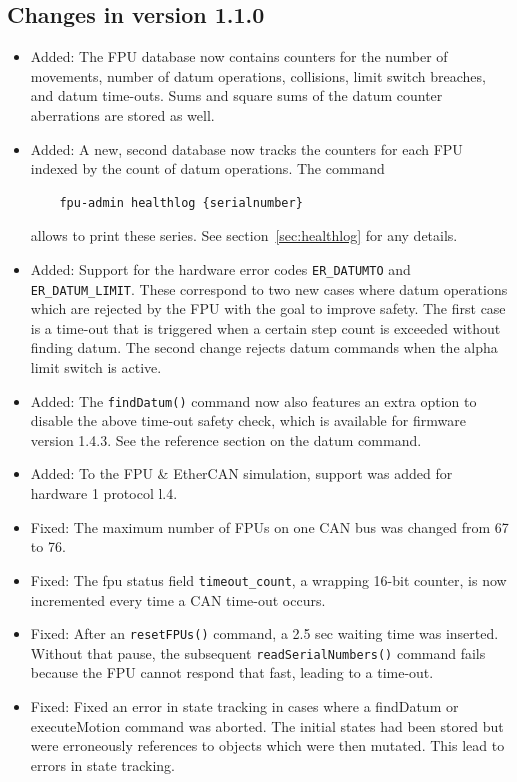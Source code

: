 \documentclass[11pt,a4paper]{scrartcl}
\begin{document}
\subsection*{Changes in version 1.1.0}
\begin{itemize}
\item Added: The FPU database now contains counters for the number of
  movements, number of datum operations, collisions, limit switch
  breaches, and datum time-outs. Sums and square sums of the datum
  counter aberrations are stored as well.

\item Added: A new, second database now tracks the counters for each
  FPU indexed by the count of datum operations. The command
  \begin{verbatim}
    fpu-admin healthlog {serialnumber}
  \end{verbatim}
  allows to print these series. See section~\ref{sec:healthlog} for
  any details.

\item Added: Support for the hardware error codes \texttt{ER\_DATUMTO}
  and \texttt{ER\_DATUM\_LIMIT}. These correspond to two new cases
  where datum operations which are rejected by the FPU with the goal
  to improve safety. The first case is a time-out that is triggered
  when a certain step count is exceeded without finding datum.  The
  second change rejects datum commands when the alpha limit switch is
  active.

\item Added: The \texttt{findDatum()} command now also features an
  extra option to disable the above time-out safety check, which is
  available for firmware version 1.4.3. See the reference section on
  the datum command.
  
\item Added: To the FPU \& EtherCAN simulation, support
  was added for hardware 1 protocol l.4. 
  
\item Fixed: The maximum number of FPUs on one CAN bus was changed
  from 67 to 76.
  
\item Fixed: The fpu status field \texttt{timeout\_count}, a wrapping
  16-bit counter, is now incremented every time a CAN time-out occurs.

\item Fixed: After an \texttt{resetFPUs()} command, a 2.5 sec waiting
  time was inserted. Without that pause, the subsequent
  \texttt{readSerialNumbers()} command fails because the FPU cannot
  respond that fast, leading to a time-out.

\item Fixed: Fixed an error in state tracking in cases where
  a findDatum or executeMotion command was aborted. The
  initial states had been stored but were erroneously
  references to objects which were then mutated. This lead
  to errors in state tracking.
  
\end{itemize}
 
\end{document}
